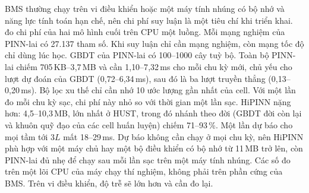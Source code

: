 BMS thường chạy trên vi điều khiển hoặc một máy tính nhúng có bộ nhớ và năng lực tính toán hạn chế, nên chi phí suy luận là một tiêu chí khi triển khai.  đo chi phí của hai mô hình cuối trên CPU một luồng. Mỗi mạng nghiệm của PINN-lai có 27.137 tham số. Khi suy luận chỉ cần mạng nghiệm, còn mạng tốc độ chỉ dùng lúc học. GBDT của PINN-lai có 100--1000 cây tuỳ bộ. Toàn bộ PINN-lai chiếm 705\,KB--3{,}7\,MB và cần 1{,}10--7{,}32\,ms cho mỗi chu kỳ mới, chủ yếu cho lượt dự đoán của GBDT (0{,}72--6{,}34\,ms), sau đó là ba lượt truyền thẳng (0{,}13--0{,}20\,ms). Bộ lọc xu thế chỉ cần nhớ 10 ước lượng gần nhất của cell. Với một lần đo mỗi chu kỳ sạc, chi phí này nhỏ so với thời gian một lần sạc. HiPINN nặng hơn: 4{,}5--10{,}3\,MB, lớn nhất ở HUST, trong đó nhánh theo đời (GBDT đời còn lại và khuôn quỹ đạo của các cell huấn luyện) chiếm 71--93\,\%. Một lần dự báo cho mọi tầm tới $3L$ mất 18--29\,ms. Dự báo không cần chạy ở mọi chu kỳ, nên HiPINN phù hợp với một máy chủ hay một bộ điều khiển có bộ nhớ từ 11\,MB trở lên, còn PINN-lai đủ nhẹ để chạy sau mỗi lần sạc trên một máy tính nhúng. Các số đo trên một lõi CPU của máy chạy thí nghiệm, không phải trên phần cứng của BMS. Trên vi điều khiển, độ trễ sẽ lớn hơn và cần đo lại.


